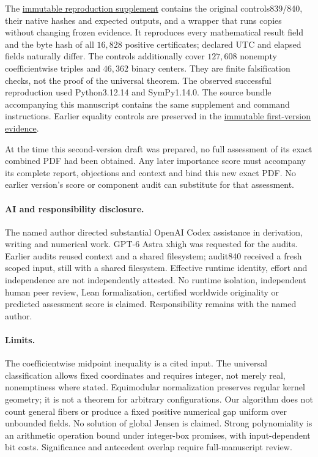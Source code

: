 \documentclass[11pt]{article}
\begin{document}
The \href{https://github.com/lluiseriksson/physmath-knowledge-tree/tree/faf47d98835980706de360a939fa79757dbd86fc/integrations/research-radar/evidence/2026-10-27-circuit857}{immutable reproduction supplement} contains the original controls839/840, their native hashes and expected outputs, and a wrapper that runs copies without changing frozen evidence. It reproduces every mathematical result field and the byte hash of all \(16{,}828\) positive certificates; declared UTC and elapsed fields naturally differ. The controls additionally cover \(127{,}608\) nonempty coefficientwise triples and \(46{,}362\) binary centers. They are finite falsification checks, not the proof of the universal theorem. The observed successful reproduction used Python3.12.14 and SymPy1.14.0. The source bundle accompanying this manuscript contains the same supplement and command instructions. Earlier equality controls are preserved in the \href{https://github.com/lluiseriksson/physmath-knowledge-tree/tree/620dfafc054a813834943f069fd9864693402f7e/integrations/research-radar/evidence/2026-10-27-rigidity834}{immutable first-version evidence}.

At the time this second-version draft was prepared, no full assessment of its exact combined PDF had been obtained. Any later importance score must accompany its complete report, objections and context and bind this new exact PDF. No earlier version's score or component audit can substitute for that assessment.

\paragraph{AI and responsibility disclosure.}
The named author directed substantial OpenAI Codex assistance in derivation, writing and numerical work. GPT-6 Astra xhigh was requested for the audits. Earlier audits reused context and a shared filesystem; audit840 received a fresh scoped input, still with a shared filesystem. Effective runtime identity, effort and independence are not independently attested. No runtime isolation, independent human peer review, Lean formalization, certified worldwide originality or predicted assessment score is claimed. Responsibility remains with the named author.

\paragraph{Limits.}
The coefficientwise midpoint inequality is a cited input. The universal classification allows fixed coordinates and requires integer, not merely real, nonemptiness where stated. Equimodular normalization preserves regular kernel geometry; it is not a theorem for arbitrary configurations. Our algorithm does not count general fibers or produce a fixed positive numerical gap uniform over unbounded fields. No solution of global Jensen is claimed. Strong polynomiality is an arithmetic operation bound under integer-box promises, with input-dependent bit costs. Significance and antecedent overlap require full-manuscript review.
\end{document}
